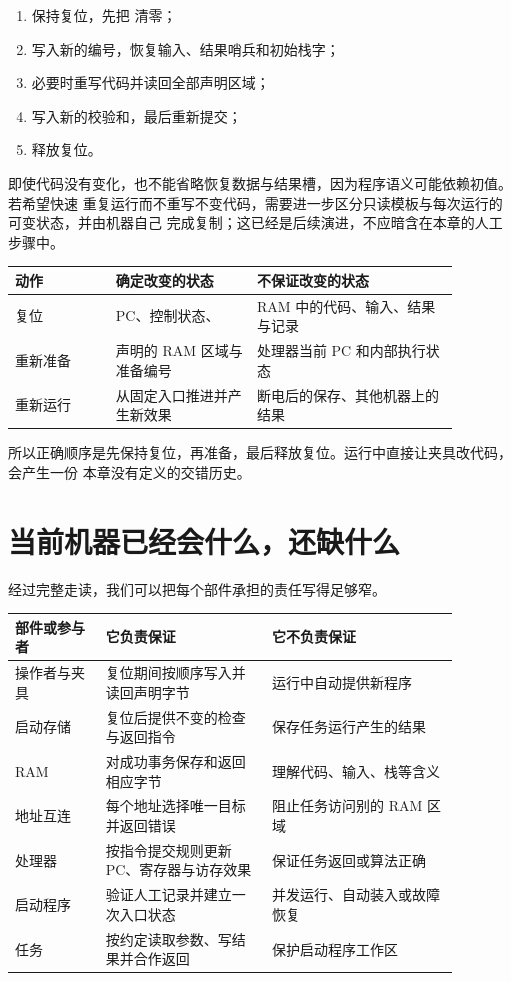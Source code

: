 \begin{enumerate}
\item 保持复位，先把  清零；
\item 写入新的编号，恢复输入、结果哨兵和初始栈字；
\item 必要时重写代码并读回全部声明区域；
\item 写入新的校验和，最后重新提交；
\item 释放复位。
\end{enumerate}

即使代码没有变化，也不能省略恢复数据与结果槽，因为程序语义可能依赖初值。若希望快速
重复运行而不重写不变代码，需要进一步区分只读模板与每次运行的可变状态，并由机器自己
完成复制；这已经是后续演进，不应暗含在本章的人工步骤中。


\begin{longtable}{|L{0.20\linewidth}|L{0.28\linewidth}|L{0.40\linewidth}|}
\hline
{}
动作 & 确定改变的状态 & 不保证改变的状态 \\ \hline
复位 & PC、控制状态、 & RAM 中的代码、输入、结果与记录 \\ \hline
重新准备 & 声明的 RAM 区域与准备编号 & 处理器当前 PC 和内部执行状态 \\ \hline
重新运行 & 从固定入口推进并产生新效果 & 断电后的保存、其他机器上的结果 \\ \hline
\end{longtable}

所以正确顺序是先保持复位，再准备，最后释放复位。运行中直接让夹具改代码，会产生一份
本章没有定义的交错历史。

\section{当前机器已经会什么，还缺什么}

经过完整走读，我们可以把每个部件承担的责任写得足够窄。

\begin{longtable}{|L{0.18\linewidth}|L{0.33\linewidth}|L{0.37\linewidth}|}
\hline
{}
部件或参与者 & 它负责保证 & 它不负责保证 \\ \hline
操作者与夹具 & 复位期间按顺序写入并读回声明字节 & 运行中自动提供新程序 \\ \hline
启动存储 & 复位后提供不变的检查与返回指令 & 保存任务运行产生的结果 \\ \hline
RAM & 对成功事务保存和返回相应字节 & 理解代码、输入、栈等含义 \\ \hline
地址互连 & 每个地址选择唯一目标并返回错误 & 阻止任务访问别的 RAM 区域 \\ \hline
处理器 & 按指令提交规则更新 PC、寄存器与访存效果 & 保证任务返回或算法正确 \\ \hline
启动程序 & 验证人工记录并建立一次入口状态 & 并发运行、自动装入或故障恢复 \\ \hline
任务 & 按约定读取参数、写结果并合作返回 & 保护启动程序工作区 \\ \hline
\end{longtable}

